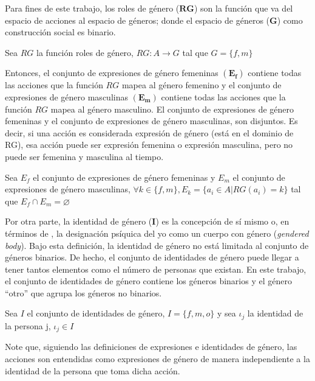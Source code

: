 Para fines de este trabajo, los roles de género ($\mathbf{RG}$) son la función que va del espacio de acciones al espacio de géneros; donde el espacio de géneros ($\mathbf{G}$) como construcción social es binario. 
\begin{framed}
\noindent Sea $RG$ la función roles de género, $RG: A \rightarrow G$ tal que $G=\{f,m\}$
\end{framed}
Entonces, el conjunto de expresiones de género femeninas $(\mathbf{E_f})$ contiene todas las acciones que la función $RG$ mapea al género femenino y el conjunto de expresiones de género masculinas $(\mathbf{E_m})$ contiene todas las acciones que la función $RG$ mapea al género masculino. El conjunto de expresiones de género femeninas y el conjunto de expresiones de género masculinas, son disjuntos. Es decir, si una acción es considerada expresión de género (está en el dominio de RG), esa acción puede ser expresión femenina o expresión masculina, pero no puede ser femenina y masculina al tiempo. 

\begin{framed}
\noindent Sea $E_f$ el conjunto de expresiones de género femeninas y $E_m$ el conjunto de expresiones de género masculinas, $\forall k \in \{f, m\}, E_k=\{a_i\in A | RG(a_i)=k  \}$ tal que $E_f \cap  E_m=\varnothing$
\end{framed}

Por otra parte, la identidad de género ($\boldsymbol{I}$) es la concepción de sí mismo o, en términos de \cite{butler2002gendertrouble}, la designación psíquica del yo como un cuerpo con género (\textit{gendered body}). Bajo esta definición, la identidad de género no está limitada al conjunto de géneros binarios. De hecho, el conjunto de identidades de género puede llegar a tener tantos elementos como el número de personas que existan. En este trabajo, el conjunto de identidades de género contiene los géneros binarios y el género ``otro'' que agrupa los géneros no binarios. 

\begin{framed}
\noindent Sea $I$ el conjunto de identidades de género, $I=\{f,m,o\}$ y sea $\iota_j$ la identidad de la persona j, $\iota_j \in I$  
\end{framed}

Note que, siguiendo las definiciones de expresiones e identidades de género, las acciones son entendidas como expresiones de género de manera independiente a la identidad de la persona que toma dicha acción. 

